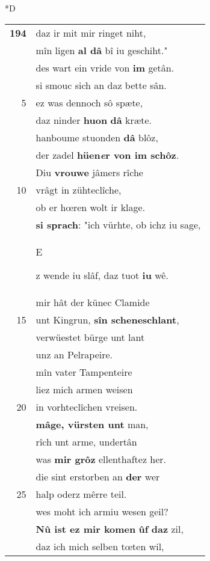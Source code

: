 \documentclass[8pt,a4paper,notitlepage]{article}
\begin{document}
\begin{table}[ht]
\begin{minipage}[t]{0.5\linewidth}
\small
\begin{center}*D
\end{center}
\begin{tabular}{rl}
\textbf{194} & daz ir mit mir ringet niht,\\ 
 & mîn ligen \textbf{al dâ} bî iu geschiht."\\ 
 & des wart ein vride von \textbf{im} getân.\\ 
 & si smouc sich an daz bette sân.\\ 
5 & ez was dennoch sô spæte,\\ 
 & daz ninder \textbf{huon} \textbf{dâ} kræte.\\ 
 & hanboume stuonden \textbf{dâ} blôz,\\ 
 & der zadel \textbf{hüen\textit{e}r von im schôz}.\\ 
 & Diu \textbf{vrouwe} jâmers rîche\\ 
10 & vrâgt in zühteclîche,\\ 
 & ob er hœren wolt ir klage.\\ 
 & \textbf{si sprach}: "ich vürhte, ob ichz iu sage,\\ 
 & \begin{large}E\end{large}z wende iu slâf, daz tuot \textbf{iu} wê.\\ 
 & mir hât der künec Clamide\\ 
15 & unt Kingrun, \textbf{sîn scheneschlant},\\ 
 & verwüestet bürge unt lant\\ 
 & unz an Pelrapeire.\\ 
 & mîn vater Tampenteire\\ 
 & liez mich armen weisen\\ 
20 & in vorhteclîchen vreisen.\\ 
 & \textbf{mâge, vürsten unt} man,\\ 
 & rîch unt arme, undertân\\ 
 & was \textbf{mir grôz} ellenthaftez her.\\ 
 & die sint erstorben an \textbf{der} wer\\ 
25 & halp oderz mêrre teil.\\ 
 & wes moht ich armiu wesen geil?\\ 
 & \textbf{Nû ist ez mir komen} \textbf{ûf} \textbf{daz} zil,\\ 
 & daz ich mich selben tœten wil,\\ 

\end{tabular}
\end{minipage}
\end{table}
\end{document}

